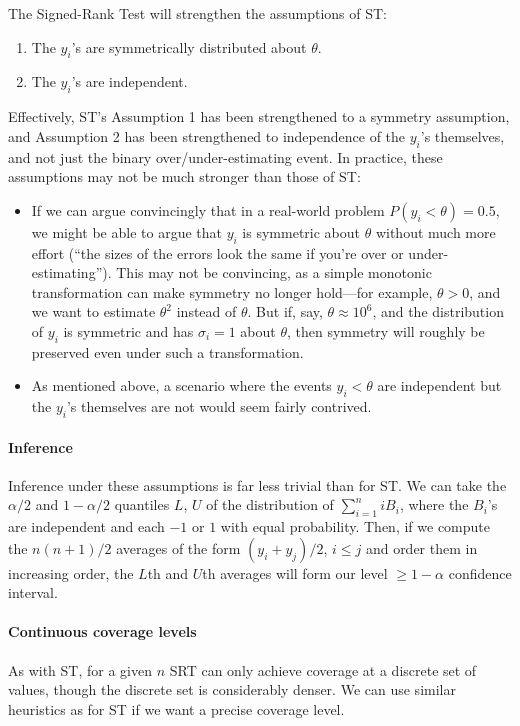 \documentclass[letterpaper,12pt]{article}
\begin{document}
The Signed-Rank Test will strengthen the assumptions of ST:

\begin{enumerate}
\item
  The $y_i$'s are symmetrically distributed about $\theta$.
\item
  The $y_i$'s are independent.
\end{enumerate}

Effectively, ST's Assumption 1 has been strengthened to a symmetry assumption, and Assumption 2 has been strengthened to independence of the $y_i$'s themselves, and not just the binary over/under-estimating event. In practice, these assumptions may not be much stronger than those of ST:

\begin{itemize}

\item
  If we can argue convincingly that in a real-world problem $P(y_i<\theta)=0.5$, we might be able to argue that $y_i$ is symmetric about $\theta$ without much more effort (``the sizes of the errors look the same if you're over or under-estimating''). This may not be convincing, as a simple monotonic transformation can make symmetry no longer hold---for example, $\theta>0$, and we want to estimate $\theta^2$ instead of $\theta$. But if, say, $\theta\approx 10^6$, and the distribution of $y_i$ is symmetric and has $\sigma_i=1$ about $\theta$, then symmetry will roughly be preserved even under such a transformation.
\item
  As mentioned above, a scenario where the events $y_i<\theta$ are independent but the $y_i$'s themselves are not would seem fairly contrived.
\end{itemize}

\paragraph{Inference}\label{inference-4}

Inference under these assumptions is far less trivial than for ST. We can take the $\alpha/2$ and $1-\alpha/2$ quantiles $L$, $U$ of the distribution of $\sum_{i=1}^n iB_i$, where the $B_i$'s are independent and each $-1$ or $1$ with equal probability. Then, if we compute the $n(n+1)/2$ averages of the form $(y_i+y_j)/2$, $i\leq j$ and order them in increasing order, the $L$th and $U$th averages will form our level $\geq 1-\alpha$ confidence interval.

\paragraph{Continuous coverage levels} As with ST, for a given $n$ SRT can only achieve coverage at a discrete set of values, though the discrete set is considerably denser. We can use similar heuristics as for ST if we want a precise coverage level.
\end{document}
